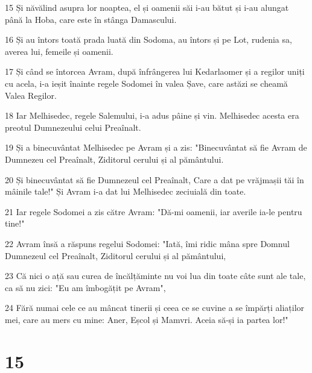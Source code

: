 \par 15 Și năvălind asupra lor noaptea, el și oamenii săi i-au bătut și i-au alungat până la Hoba, care este în stânga Damascului.
\par 16 Și au întors toată prada luată din Sodoma, au întors și pe Lot, rudenia sa, averea lui, femeile și oamenii.
\par 17 Și când se întorcea Avram, după înfrângerea lui Kedarlaomer și a regilor uniți cu acela, i-a ieșit înainte regele Sodomei în valea Șave, care astăzi se cheamă Valea Regilor.
\par 18 Iar Melhisedec, regele Salemului, i-a adus pâine și vin. Melhisedec acesta era preotul Dumnezeului celui Preaînalt.
\par 19 Și a binecuvântat Melhisedec pe Avram și a zis: "Binecuvântat să fie Avram de Dumnezeu cel Preaînalt, Ziditorul cerului și al pământului.
\par 20 Și binecuvântat să fie Dumnezeul cel Preaînalt, Care a dat pe vrăjmașii tăi în mâinile tale!" Și Avram i-a dat lui Melhisedec zeciuială din toate.
\par 21 Iar regele Sodomei a zis către Avram: "Dă-mi oamenii, iar averile ia-le pentru tine!"
\par 22 Avram însă a răspuns regelui Sodomei: "Iată, îmi ridic mâna spre Domnul Dumnezeul cel Preaînalt, Ziditorul cerului și al pământului,
\par 23 Că nici o ață sau curea de încălțăminte nu voi lua din toate câte sunt ale tale, ca să nu zici: "Eu am îmbogățit pe Avram",
\par 24 Fără numai cele ce au mâncat tinerii și ceea ce se cuvine a se împărți aliaților mei, care au mers cu mine: Aner, Eșcol și Mamvri. Aceia să-și ia partea lor!"

\chapter{15}

